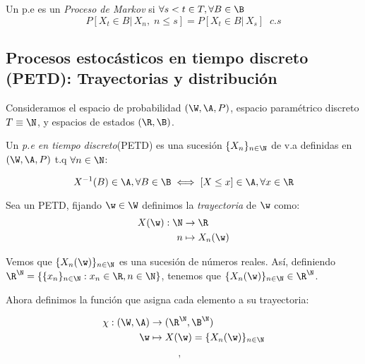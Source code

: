 \begin{ndef}
  Un p.e es un \emph{Proceso de Markov} si  $\forall s<t \in T, \forall B \in \B$ $$P[X_t \in B | \, X_n, \; n \leq s] = P[X_t \in B | \, X_s] \; \; c.s$$
\end{ndef}

\subsection{Procesos estocásticos en tiempo discreto (PETD): Trayectorias y distribución}

Consideramos el espacio de probabilidad $(\W, \A, P)$, espacio paramétrico discreto $T \equiv \N$, y espacios de estados $(\R, \B)$.

\begin{ndef}
  Un \emph{p.e en tiempo discreto}(PETD) es una sucesión $\{X_n\}_{n \in \N}$ de v.a definidas en $(\W, \A, P)$ t.q $\forall n \in \N$:

  $$X^{-1}(B) \in \A, \forall B \in \B \iff [X \leq x] \in \A, \forall x \in \R$$
\end{ndef}

\begin{ndef}
  Sea un PETD, fijando $\w \in \W$ definimos la \emph{trayectoria} de $\w$ como:
  \begin{align*}
    X(\w): \N & \to \R \\
    n & \mapsto X_n(\w)
  \end{align*}

\end{ndef}

Vemos que $\{X_n(\w)\}_{n\in\N}$ es una sucesión de números reales. Así, definiendo $\R^\N = \{ \{x_n\}_{n \in \N} : x_n \in \R, n \in \N\}$, tenemos que $\{X_n(\w)\}_{n \in \N} \in \R^\N$.

Ahora definimos la función que asigna cada elemento a su trayectoria:

\begin{align*}
  \chi : (\W, \A) & \to (\R^\N, \B^\N) \\
  \w & \mapsto X(\w) = \{X_n(\w)\}_{n \in \N}
\end{align*}


$$, \text{ } $$
